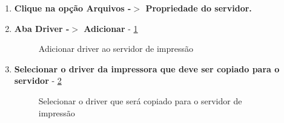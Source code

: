 \begin{enumerate}

	\item \textbf{Clique na opção Arquivos -$>$ Propriedade do servidor.}%
	
	
 	\item \textbf{Aba Driver -$>$ Adicionar} - \ref{adicionar_driver}
	\begin{figure}[ht]
	   	\centering
	   	\caption{Adicionar driver ao servidor de impressão}
	    \label{adicionar_driver}
	\end{figure}
	
	\pagebreak
	
	\item \textbf{Selecionar o driver da impressora que deve ser copiado para o servidor} - \ref{selecionar_driver}
	\begin{figure}[ht]
	   	\centering
	   	\caption{Selecionar o driver que será copiado para o servidor de impressão}
	    \label{selecionar_driver}
	\end{figure}
	

\end{enumerate}
